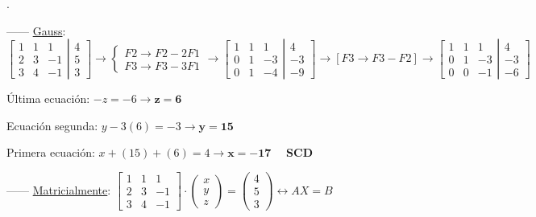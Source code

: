 \begin{proofw}\renewcommand{\qedsymbol}{$\diamond$}.

------ \underline{Gauss}:  $\left[ \begin{matrix} 1&1&1\\2&3&-1\\3&4&-1 \end{matrix} \right| \left. \begin{matrix} 4\\5\\3 \end{matrix} \right] \to \begin{cases} F2\to F2-2F1\\F3\to F3-3F1 \end{cases} \to 
\left[ \begin{matrix} 1&1&1\\0&1&-3\\0&1&-4 \end{matrix} \right| \left. \begin{matrix} 4\\-3\\-9 \end{matrix} \right]  \to [F3\to F3-F2] \to 
\left[ \begin{matrix} 1&1&1\\0&1&-3\\0&0&-1 \end{matrix} \right| \left. \begin{matrix} 4\\-3\\-6 \end{matrix} \right] $

Última ecuación: $-z=-6 \to \boldsymbol{z=6}$

Ecuación segunda: $y-3(6)=-3 \to \boldsymbol{y=15}$

Primera ecuación: $x+(15)+(6)=4 \to \boldsymbol{x=-17}\quad $ \textbf{SCD}

------ \underline{Matricialmente}: $\left[ \begin{matrix} 1&1&1\\2&3&-1\\3&4&-1 \end{matrix} \right] \cdot \left( \begin{matrix} x\\y\\z \end{matrix} \right) =  \left( \begin{matrix} 4\\5\\3 \end{matrix} \right) \leftrightarrow AX=B $


\end{proofw}
